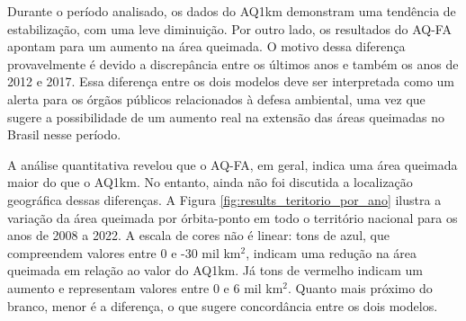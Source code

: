 \documentclass[cic,tc]{iiufrgs}
\begin{document}
Durante o período analisado, os dados do AQ1km demonstram uma tendência de estabilização, com uma leve diminuição. Por outro lado, os resultados do AQ-FA apontam para um aumento na área queimada. O motivo dessa diferença provavelmente é devido a discrepância entre os últimos anos e também os anos de 2012 e 2017. 
Essa diferença entre os dois modelos deve ser interpretada como um alerta para os órgãos públicos relacionados à defesa ambiental, uma vez que sugere a possibilidade de um aumento real na extensão das áreas queimadas no Brasil nesse período.

A análise quantitativa revelou que o AQ-FA, em geral, indica uma área queimada maior do que o AQ1km. No entanto, ainda não foi discutida a localização geográfica dessas diferenças. A Figura \ref{fig:results_teritorio_por_ano} ilustra a variação da área queimada por órbita-ponto em todo o território nacional para os anos de 2008 a 2022. A escala de cores não é linear: tons de azul, que compreendem valores entre 0 e -30 mil km$^2$, indicam uma redução na área queimada em relação ao valor do AQ1km. Já tons de vermelho indicam um aumento e representam valores entre 0 e 6 mil km$^2$. Quanto mais próximo do branco, menor é a diferença, o que sugere concordância entre os dois modelos.
\end{document}
